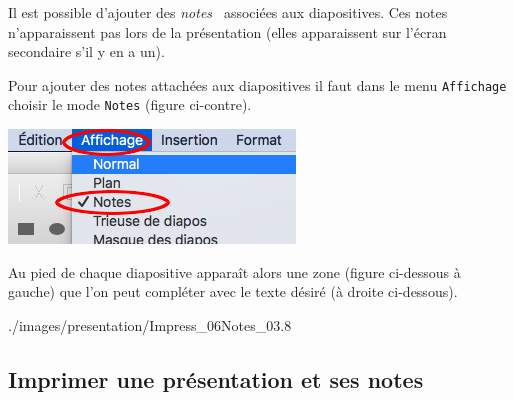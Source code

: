 \begin{minipage}[c]{.68\textwidth}
Il est possible d'ajouter des \emph{\og notes \fg} associées aux diapositives. Ces notes n'apparaissent pas lors de la présentation (elles apparaissent sur l'écran secondaire s'il y en a un).

Pour ajouter des notes attachées aux diapositives il faut dans le menu \texttt{Affichage} choisir le mode \texttt{Notes} (figure ci-contre).
\end{minipage}\hfill%
\begin{minipage}[c]{.28\textwidth}
\centering%
\includegraphics[angle=0,width=\textwidth]{./images/presentation/Impress_06Notes_01}
\end{minipage}

\vspace{1em}

Au pied de chaque diapositive apparaît alors une zone (figure ci-dessous à gauche) que l'on peut compléter avec le texte désiré (à droite ci-dessous).

	      {./images/presentation/Impress_06Notes_03}{.8\textwidth}








\subsection{Imprimer une présentation et ses notes}\label{Presentation1export}


